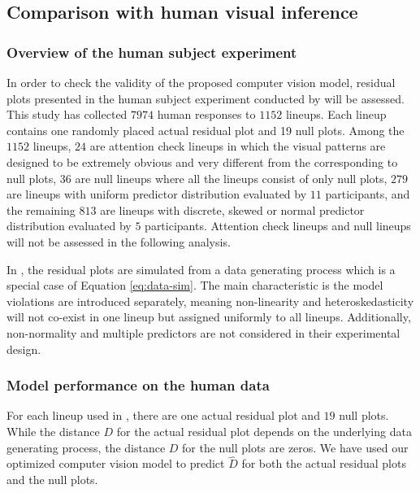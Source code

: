 \documentclass[]{interact}
\theoremstyle{plain}%
\theoremstyle{definition}
\theoremstyle{remark}
\begin{document}
\hypertarget{comparison-with-human-visual-inference}{%
\subsection{Comparison with human visual
inference}\label{comparison-with-human-visual-inference}}

\hypertarget{overview-of-the-human-subject-experiment}{%
\subsubsection{Overview of the human subject
experiment}\label{overview-of-the-human-subject-experiment}}

In order to check the validity of the proposed computer vision model,
residual plots presented in the human subject experiment conducted by
\citet{li2023plot} will be assessed. This study has collected \(7974\)
human responses to \(1152\) lineups. Each lineup contains one randomly
placed actual residual plot and 19 null plots. Among the \(1152\)
lineups, \(24\) are attention check lineups in which the visual patterns
are designed to be extremely obvious and very different from the
corresponding to null plots, \(36\) are null lineups where all the
lineups consist of only null plots, \(279\) are lineups with uniform
predictor distribution evaluated by \(11\) participants, and the
remaining \(813\) are lineups with discrete, skewed or normal predictor
distribution evaluated by \(5\) participants. Attention check lineups
and null lineups will not be assessed in the following analysis.

In \citet{li2023plot}, the residual plots are simulated from a data
generating process which is a special case of Equation
\ref{eq:data-sim}. The main characteristic is the model violations are
introduced separately, meaning non-linearity and heteroskedasticity will
not co-exist in one lineup but assigned uniformly to all lineups.
Additionally, non-normality and multiple predictors are not considered
in their experimental design.

\hypertarget{model-performance-on-the-human-data}{%
\subsubsection{Model performance on the human
data}\label{model-performance-on-the-human-data}}

For each lineup used in \citet{li2023plot}, there are one actual
residual plot and \(19\) null plots. While the distance \(D\) for the
actual residual plot depends on the underlying data generating process,
the distance \(D\) for the null plots are zeros. We have used our
optimized computer vision model to predict \(\hat{D}\) for both the
actual residual plots and the null plots.
\end{document}
